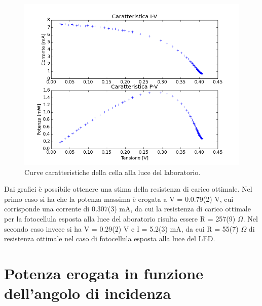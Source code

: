 \documentclass[journal, a4paper]{IEEEtran}
\begin{document}
\begin{figure}[htp]
\centering
\includegraphics[scale=.45]{es4_luceled}
\caption{Curve caratteristiche della cella alla luce del laboratorio.}
\label{fig:led}
\end{figure}

Dai grafici è possibile ottenere una stima della resistenza di carico ottimale. Nel primo caso si ha che la potenza massima è erogata a V = 0.0.79(2) V, cui corrisponde una corrente di 0.307(3) mA, da cui la resistenza di carico ottimale per la fotocellula esposta alla luce del aboratorio risulta essere R = 257(9) $\Omega$.
Nel secondo caso invece si ha V = 0.29(2) V e I = 5.2(3) mA, da cui R = 55(7) $\Omega$ di resistenza ottimale nel caso di fotocellula esposta alla luce del LED.


\section{Potenza erogata in funzione dell'angolo di incidenza}
\end{document}
